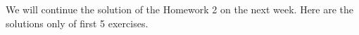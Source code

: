 
    We will continue the solution of the Homework 2 on the next week.
  Here are the solutions only of first 5 exercises.

            \bye
